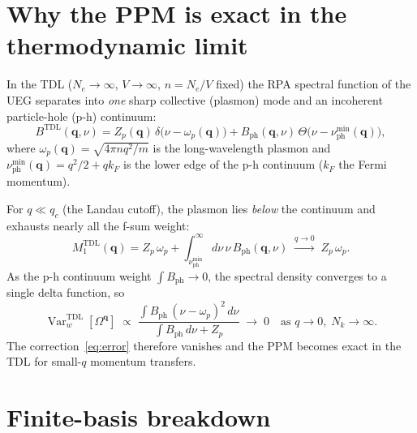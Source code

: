 \documentclass[11pt]{article}
\newcommand{\bq}{\mathbf{q}}
\newcommand{\Om}{\Omega}
\begin{document}
\section{Why the PPM is exact in the thermodynamic limit}

In the TDL ($N_e\to\infty$, $V\to\infty$, $n=N_e/V$ fixed) the RPA
spectral function of the UEG separates into \emph{one} sharp collective (plasmon)
mode and an incoherent particle-hole (p-h) continuum:
\begin{equation}
  B^\text{TDL}(\bq,\nu) = Z_p(\bq)\,\delta\!\bigl(\nu-\omega_p(\bq)\bigr)
  + B_\text{ph}(\bq,\nu)\,\Theta\!\bigl(\nu-\nu_\text{ph}^\text{min}(\bq)\bigr),
\end{equation}
where $\omega_p(\bq)=\sqrt{4\pi n q^2/m}$ is the long-wavelength plasmon
and $\nu_\text{ph}^\text{min}(\bq)=q^2/2+qk_F$ is the lower edge of the
p-h continuum ($k_F$ the Fermi momentum).

For $q\ll q_c$ (the Landau cutoff), the plasmon lies \emph{below} the
continuum and exhausts nearly all the f-sum weight:
\begin{equation}
  M_1^\text{TDL}(\bq)
  = Z_p\,\omega_p
    + \int_{\nu_\text{ph}^\text{min}}^\infty\!\! d\nu\,\nu\,B_\text{ph}(\bq,\nu)
  \;\xrightarrow{q\to 0}\; Z_p\,\omega_p.
\end{equation}
As the p-h continuum weight $\int B_\text{ph} \to 0$, the spectral
density converges to a single delta function, so
\begin{equation}
  \operatorname{Var}_w^\text{TDL}[\Om^\bq]
  \;\propto\;
  \frac{\int B_\text{ph}\,(\nu-\omega_p)^2\,d\nu}
       {\int B_\text{ph}\,d\nu + Z_p}
  \;\to\; 0
  \quad\text{as }q\to 0,\; N_k\to\infty.
  \label{eq:var-tdl}
\end{equation}
The correction~\eqref{eq:error} therefore vanishes and the PPM becomes
exact in the TDL for small-$q$ momentum transfers.

\section{Finite-basis breakdown}
\end{document}
